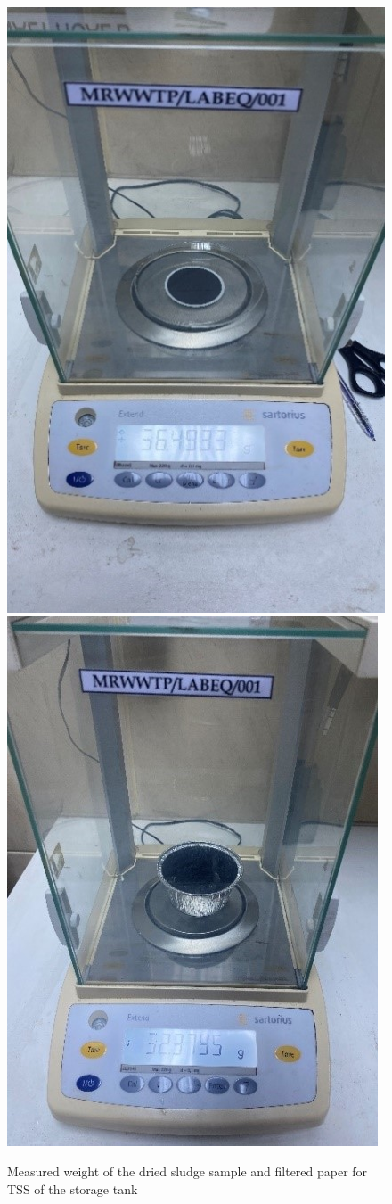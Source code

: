 \begin{figure}[H]
\centering

\includegraphics[width=.4\textwidth]{results/TSS.JPG}\hfill
\includegraphics[width=.45\textwidth]{results/Dewatered sludge.jpg}\hfill

\caption{Measured weight of the dried sludge sample and filtered paper for \ac{TSS} of the storage tank}
\label{fig: TSS and Moisture content}
\end{figure}
